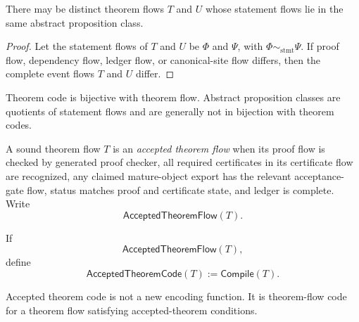 \begin{proposition}
\label{prop:theorem-proof-proposition-many-flows}
There may be distinct theorem flows $T$ and $U$ whose statement flows lie in the same abstract proposition class.
\end{proposition}

\begin{proof}
Let the statement flows of $T$ and $U$ be $\Phi$ and $\Psi$, with $\Phi\sim_{\mathrm{stmt}}\Psi$. If proof flow, dependency flow, ledger flow, or canonical-site flow differs, then the complete event flows $T$ and $U$ differ.
\end{proof}

\begin{corollary}
\label{cor:theorem-proof-proposition-not-code}
Theorem code is bijective with theorem flow. Abstract proposition classes are quotients of statement flows and are generally not in bijection with theorem codes.
\end{corollary}

\begin{definition}
\label{def:theorem-proof-accepted-theorem-flow}
A sound theorem flow $T$ is an \emph{accepted theorem flow} when its proof flow is checked by generated proof checker, all required certificates in its certificate flow are recognized, any claimed mature-object export has the relevant acceptance-gate flow, status matches proof and certificate state, and ledger is complete. Write
$$
  \mathsf{AcceptedTheoremFlow}(T).
$$
\end{definition}

\begin{definition}
\label{def:theorem-proof-accepted-theorem-code}
If
$$
  \mathsf{AcceptedTheoremFlow}(T),
$$
define
$$
  \mathsf{AcceptedTheoremCode}(T):=\mathsf{Compile}(T).
$$
\end{definition}

\begin{proposition}
\label{prop:theorem-proof-accepted-code-same-code}
Accepted theorem code is not a new encoding function. It is theorem-flow code for a theorem flow satisfying accepted-theorem conditions.
\end{proposition}

